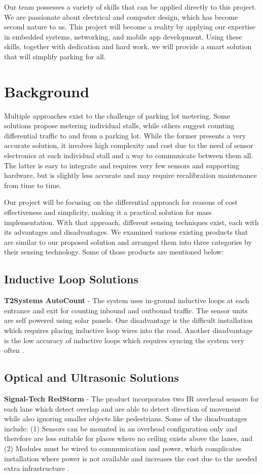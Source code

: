 \documentclass[letterpaper,10 pt,conference,onecolumn]{IEEEtran}
\begin{document}
		Our team possesses a variety of skills that can be applied directly to this project. We are passionate about electrical and computer design, which has become second nature to us. This project will become a reality by applying our expertise in embedded systems, networking, and mobile app development. Using these skills, together with dedication and hard work, we will provide a smart solution that will simplify parking for all.

	\section{Background}
		Multiple approaches exist to the challenge of parking lot metering. Some solutions propose metering individual stalls, while others suggest counting differential traffic to and from a parking lot. While the former presents a very accurate solution, it involves high complexity and cost due to the need of sensor electronics at each individual stall and a way to communicate between them all. The latter is easy to integrate and requires very few sensors and supporting hardware, but is slightly less accurate and may require recalibration maintenance from time to time.
		
		Our project will be focusing on the differential approach for reasons of cost effectiveness and simplicity, making it a practical solution for mass implementation. With that approach, different sensing techniques exist, each with its advantages and disadvantages. We examined various existing products that are similar to our proposed solution and arranged them into three categories by their sensing technology. Some of those products are mentioned below:
		
		\subsection{Inductive Loop Solutions}
			\textbf{T2Systems AutoCount} - The system uses in-ground inductive loops at each entrance and exit for counting inbound and outbound traffic. The sensor units are self powered using solar panels. One disadvantage is the difficult installation which requires placing inductive loop wires into the road. Another disadvantage is the low accuracy of inductive loops which requires syncing the system very often \cite{autocount}.
	
		\subsection{Optical and Ultrasonic Solutions}
			\textbf{Signal-Tech RedStorm} - The product incorporates two IR overhead sensors for each lane which detect overlap and are able to detect direction of movement while also ignoring smaller objects like pedestrians. Some of the disadvantages include: (1) Sensors can be mounted in an overhead configuration only and therefore are less suitable for places where no ceiling exists above the lanes, and (2) Modules must be wired to communication and power, which complicates installation where power is not available and increases the cost due to the needed extra infrastructure \cite{redstorm}.
		
\end{document}
